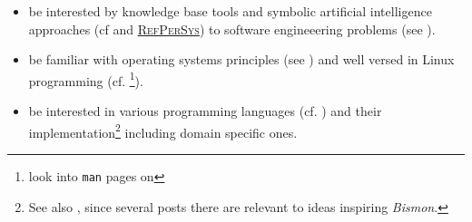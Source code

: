 \begin{itemize}
  \item be interested by knowledge base tools and symbolic artificial
    intelligence approaches (cf \cite{nouira:1996:knowledge,
      Pitrat:1990:Metaconnaissances, Pitrat:1996:FGCS,
      Polito:2014:Bootstrapping-pharo, RAJ-2018-NoSQL,
      Rodriguez:2019:AgileLean, doyle:1985:expert,
      Starynkevitch-1990-EUM} and
    \href{http://refpersys.org}{\textsc{RefPerSys}}) to software
    engineeering problems (see \cite{rich2014readings,
      beckert2007verification, happel2006applications,
      rus2002knowledge, Baudin2002CaveatAT, TWO:2001:WAPATV,
      Starynkevitch2007Multistage, Starynkevitch:2009:grow,
      FITZ:2019:metamodel-cyberphysys}).

\item be familiar with operating systems principles
  (see \cite{Tanenbaum:92:OS,ArpaciDusseau14-Book}) and well
  versed in Linux programming
  (cf. \cite{Mitchell:2001:ALP,Kerrisk:2010:LinuxProgramming} \footnote{look
    into \texttt{man} pages on
    }).

  \item be interested in various 
     programming languages
    (cf. \cite{Abelson1996:SICP,Scott:2007:PLP,Queinnec:1996:LSP}) and
    their 
    implementation\footnote{See also
      , since several posts there are
      relevant to ideas inspiring \emph{Bismon}.}  including
       domain specific ones.


\end{itemize}
